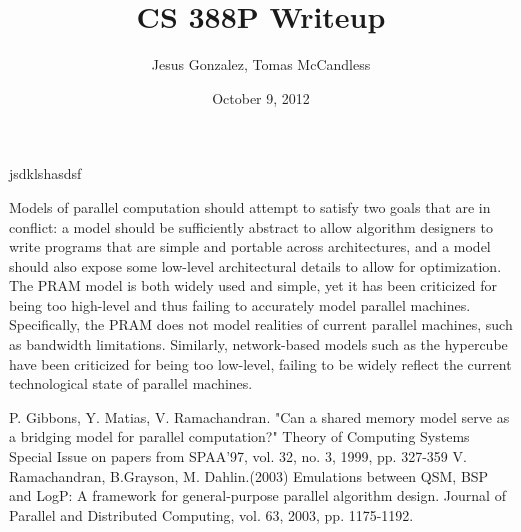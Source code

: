 \documentclass[12pt,a4paper]{report}
\author{Jesus Gonzalez, Tomas McCandless}
\title{CS 388P Writeup}
\date{October 9, 2012}
\begin{document}
\maketitle
{}
\doublespace

jsdklshasdsf \cite{Gib99} \cite{Vlr03}

Models of parallel computation should attempt to satisfy two goals that are in conflict: a model should be sufficiently abstract to allow algorithm designers to
write programs that are simple and portable across architectures, and a model should also expose some low-level architectural details to allow for optimization. 
The PRAM model is both widely used and simple, yet it has been criticized for being too high-level and thus failing to accurately model parallel machines.
Specifically, the PRAM does not model realities of current parallel machines, such as bandwidth limitations. Similarly, network-based models such as the
hypercube have been criticized for being too low-level, failing to be widely reflect the current technological state of parallel machines. 

\singlespace
\begin{thebibliography}{9}

 P. Gibbons, Y. Matias, V. Ramachandran. "Can a shared memory model serve as a bridging model for parallel computation?" Theory of Computing Systems Special Issue on papers from SPAA'97, vol. 32, no. 3, 1999, pp. 327-359
 V. Ramachandran, B.Grayson, M. Dahlin.(2003) Emulations between QSM, BSP and LogP: A framework for general-purpose parallel algorithm design. Journal of Parallel and Distributed Computing, vol. 63, 2003, pp. 1175-1192. 
\end{thebibliography}
\end{document}
